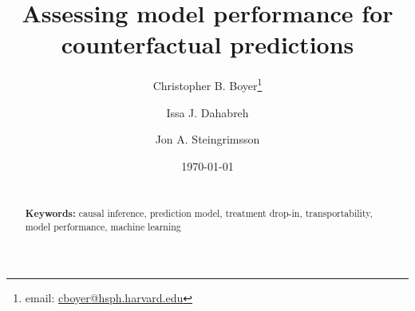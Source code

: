 \documentclass[11pt]{article}
\begin{document}
\begin{titlepage}
\title{Assessing model performance for counterfactual predictions} %
\author[1]{Christopher B. Boyer\thanks{email: \href{mailto:cboyer@hsph.harvard.edu}{cboyer@hsph.harvard.edu}}}
\author[1-3]{Issa J. Dahabreh}
\author[4]{Jon A. Steingrimsson}


\date{\today}
\maketitle

\begin{abstract}
\noindent 
\vspace{0in} \\
\noindent\textbf{Keywords:} causal inference, prediction model, treatment drop-in, transportability, model performance, machine learning \\

\bigskip
\end{abstract}
\setcounter{page}{0}
\thispagestyle{empty}
\end{titlepage}
\pagebreak \newpage

\doublespacing



\clearpage

\printbibliography

\clearpage

\begin{appendix}
    \renewcommand{\thefigure}{A\arabic{figure}}
    \setcounter{figure}{0}
    
    \renewcommand{\thetable}{A\arabic{table}}
    \setcounter{table}{0}
    
    \renewcommand{\theequation}{A\arabic{equation}}
    \setcounter{equation}{0}

    \renewcommand{\thesection}{\Alph{section}}

    \newpage

    
\end{appendix}

\onehalfspacing
\end{document}
